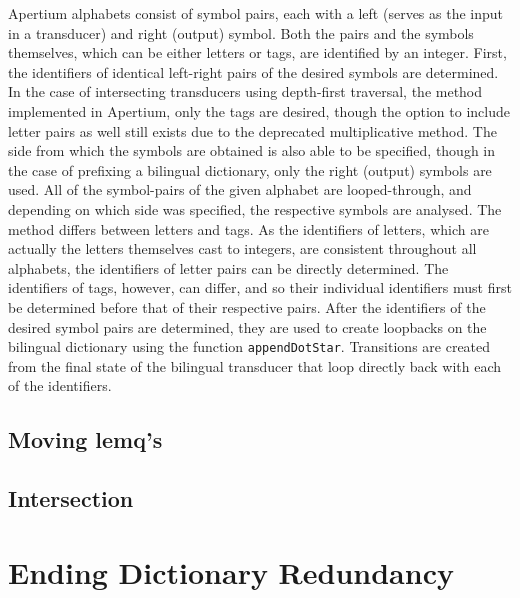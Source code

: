 \documentclass[10pt, a4paper]{article}
\begin{document}
Apertium alphabets consist of symbol pairs, each with a left (serves
as the input in a transducer) and right (output) symbol. Both the
pairs and the symbols themselves, which can be either letters or tags,
are identified by an integer. First, the identifiers of identical
left-right pairs of the desired symbols are determined. In the case of
intersecting transducers using depth-first traversal, the method
implemented in Apertium, only the tags are desired, though the option
to include letter pairs as well still exists due to the deprecated
multiplicative method. The side from which the symbols are obtained is
also able to be specified, though in the case of prefixing a bilingual
dictionary, only the right (output) symbols are used. All of the
symbol-pairs of the given alphabet are looped-through, and depending
on which side was specified, the respective symbols are analysed. The
method differs between letters and tags. As the identifiers of
letters, which are actually the letters themselves cast to integers,
are consistent throughout all alphabets, the identifiers of letter
pairs can be directly determined. The identifiers of tags, however,
can differ, and so their individual identifiers must first be
determined before that of their respective pairs. After the
identifiers of the desired symbol pairs are determined, they are used
to create loopbacks on the bilingual dictionary using the function
\texttt{appendDotStar}. Transitions are created from the final state
of the bilingual transducer that loop directly back with each of the
identifiers.

\subsection{Moving lemq's}

\subsection{Intersection}


\section{Ending Dictionary Redundancy}
\end{document}
